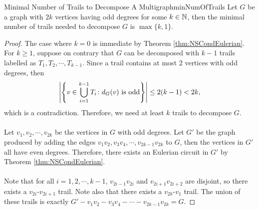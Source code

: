 \documentclass[math, code]{amznotes}
\theoremstyle{remark}
\begin{document}
\begin{probox}{Minimal Number of Trails to Decompose A Multigraph}{minNumOfTrails}
    Let $G$ be a graph with $2k$ vertices having odd degrees for some $k \in \mathbb{N}$, then the minimal number of trails needed to decompose $G$ is $\max\{k, 1\}$.
    \tcblower
    \begin{proof}
        The case where $k = 0$ is immediate by Theorem \ref{thm:NSCondEulerian}. For $k \geq 1$, suppose on contrary that $G$ can be decomposed with $k - 1$ trails labelled as $T_1, T_2, \cdots, T_{k - 1}$. Since a trail contains at most $2$ vertices with odd degrees, then
        \begin{equation*}
            {\left\lvert {\left\{v \in \bigcup_{i = 1}^{k - 1}T_i \colon d_G(v) \textrm{ is odd}\right\}} \right\rvert} \leq 2(k - 1) < 2k,
        \end{equation*}
        which is a contradiction. Therefore, we need at least $k$ trails to decompose $G$. 
        \\\\
        Let $v_1, v_2, \cdots, v_{2k}$ be the vertices in $G$ with odd degrees. Let $G'$ be the graph produced by adding the edges $v_1v_2, v_3v_4, \cdots, v_{2k - 1}v_{2k}$ to $G$, then the vertices in $G'$ all have even degrees. Therefore, there exists an Eulerian circuit in $G'$ by Theorem \ref{thm:NSCondEulerian}.
        \\\\
        Note that for all $i = 1, 2, \cdots, k - 1$, $v_{2i - 1}v_{2i}$ and $v_{2i + 1}v_{2i + 2}$ are disjoint, so there exists a $v_{2i}$-$v_{2i + 1}$ trail. Note also that there exists a $v_{2k}$-$v_1$ trail. The union of these trails is exactly $G' - v_1v_2 - v_3v_4 - \cdots - v_{2k - 1}v_{2k} = G$.
    \end{proof}
\end{probox}
\end{document}
